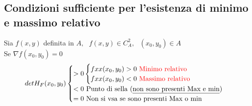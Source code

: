 \documentclass{book}
\begin{document}
\subsection{Condizioni sufficiente per l'esistenza di minimo e massimo relativo}
Sia $f(x,y)$ definita in $A,\text{ } f(x,y)\in C^2_A, \text{ } (x_0,y_0)\in A$\\
Se $\nabla f(x_0,y_0)=0$
\begin{equation*}
  det H_F(x_0,y_0)\begin{cases}
                    >0 \begin{cases}
                         fxx(x_0,y_0)>0 \text{ \color{red} Minimo relativo}\\
                         fxx(x_0,y_0)<0 \text{ \color{red} Massimo relativo}
                       \end{cases}\\
                    <0 \text{ Punto di sella (\underline{non sono presenti Max e min})}\\
                    =0 \text{ Non si vsa se sono presenti Max o min}
                  \end{cases}
\end{equation*}
\end{document}

